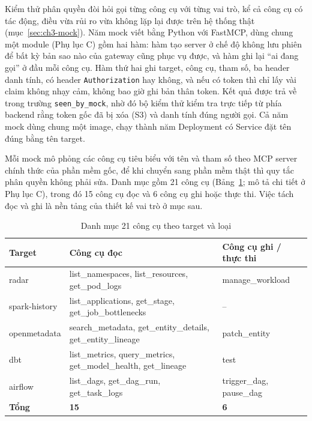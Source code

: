 Kiểm thử phân quyền đòi hỏi gọi từng công cụ với từng vai trò, kể cả công cụ có tác động, điều vừa rủi ro vừa không lặp lại được trên hệ thống thật (mục~\ref{sec:ch3-mock}). Năm mock viết bằng Python với FastMCP, dùng chung một module (Phụ lục C) gồm hai hàm: hàm tạo server ở chế độ không lưu phiên để bất kỳ bản sao nào của gateway cũng phục vụ được, và hàm ghi lại ``ai đang gọi'' ở đầu mỗi công cụ. Hàm thứ hai ghi target, công cụ, tham số, ba header danh tính, có header \texttt{Authorization} hay không, và nếu có token thì chỉ lấy vài claim không nhạy cảm, không bao giờ ghi bản thân token. Kết quả được trả về trong trường \texttt{seen\_by\_mock}, nhờ đó bộ kiểm thử kiểm tra trực tiếp từ phía backend rằng token gốc đã bị xóa (S3) và danh tính đúng người gọi. Cả năm mock dùng chung một image, chạy thành năm Deployment có Service đặt tên đúng bằng tên target.

Mỗi mock mô phỏng các công cụ tiêu biểu với tên và tham số theo MCP server chính thức của phần mềm gốc, để khi chuyển sang phần mềm thật thì quy tắc phân quyền không phải sửa. Danh mục gồm 21 công cụ (Bảng~\ref{tab:tools}; mô tả chi tiết ở Phụ lục C), trong đó 15 công cụ đọc và 6 công cụ ghi hoặc thực thi. Việc tách đọc và ghi là nền tảng của thiết kế vai trò ở mục sau.

\begin{table}[H]\centering\caption{Danh mục 21 công cụ theo target và loại}\label{tab:tools}
{\singlespacing\renewcommand{\arraystretch}{1.15}\small
\begin{tabularx}{\textwidth}{|p{2.3cm}|X|p{3.6cm}|}\hline
\textbf{Target} & \textbf{Công cụ đọc} & \textbf{Công cụ ghi / thực thi} \\ \hline
radar & list\_namespaces, list\_resources, get\_pod\_logs & manage\_workload \\ \hline
spark-history & list\_applications, get\_stage, get\_job\_bottlenecks & -- \\ \hline
openmetadata & search\_metadata, get\_entity\_details, get\_entity\_lineage & patch\_entity \\ \hline
dbt & list\_metrics, query\_metrics, get\_model\_health, get\_lineage & test \\ \hline
airflow & list\_dags, get\_dag\_run, get\_task\_logs & trigger\_dag, pause\_dag \\ \hline
\textbf{Tổng} & \textbf{15} & \textbf{6} \\ \hline
\end{tabularx}}\end{table}


